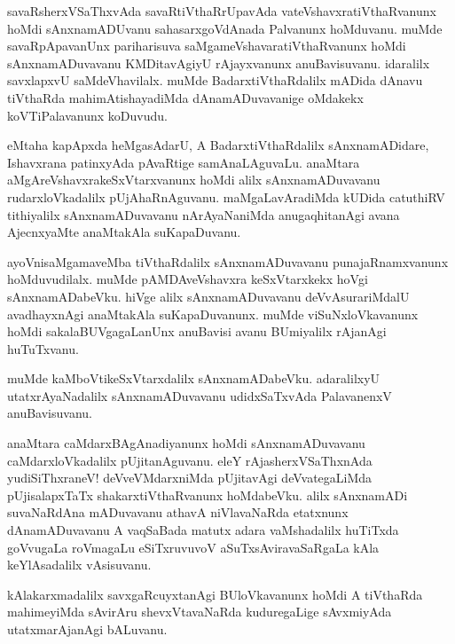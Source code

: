 \documentclass{article}
\begin{document}
\begin{mn}
savaRsherxVSaThxvAda savaRtiVthaRrUpavAda vateVshavxratiVthaRvanunx hoMdi sAnxnamADUvanu 
sahasarxgoVdAnada Palvanunx  hoMduvanu. muMde savaRpApavanUnx pariharisuva 
saMgameVshavaratiVthaRvanunx hoMdi sAnxnamADuvavanu KMDitavAgiyU rAjayxvanunx anuBavisuvanu. 
idaralilx savxlapxvU saMdeVhavilalx. muMde BadarxtiVthaRdalilx mADida dAnavu tiVthaRda 
mahimAtishayadiMda dAnamADuvavanige oMdakekx koVTiPalavanunx koDuvudu.
\end{mn}

\begin{mn}
eMtaha kapApxda heMgasAdarU, A BadarxtiVthaRdalilx sAnxnamADidare, Ishavxrana patinxyAda pAvaRtige 
samAnaLAguvaLu. anaMtara aMgAreVshavxrakeSxVtarxvanunx hoMdi alilx sAnxnamADuvavanu 
rudarxloVkadalilx pUjAhaRnAguvanu. maMgaLavAradiMda kUDida  catuthiRV tithiyalilx sAnxnamADuvavanu
nArAyaNaniMda anugaqhitanAgi avana AjecnxyaMte anaMtakAla suKapaDuvanu.
\end{mn}

\begin{mn}
ayoVnisaMgamaveMba tiVthaRdalilx sAnxnamADuvavanu punajaRnamxvanunx hoMduvudilalx. muMde 
pAMDAveVshavxra keSxVtarxkekx hoVgi sAnxnamADabeVku. hiVge alilx sAnxnamADuvavanu 
deVvAsurariMdalU avadhayxnAgi anaMtakAla suKapaDuvanunx. muMde viSuNxloVkavanunx hoMdi 
sakalaBUVgagaLanUnx anuBavisi avanu BUmiyalilx rAjanAgi huTuTxvanu.
\end{mn}

\begin{mn}
muMde kaMboVtikeSxVtarxdalilx sAnxnamADabeVku. adaralilxyU utatxrAyaNadalilx sAnxnamADuvavanu 
udidxSaTxvAda PalavanenxV anuBavisuvanu.
\end{mn}

\begin{mn}
anaMtara caMdarxBAgAnadiyanunx hoMdi sAnxnamADuvavanu caMdarxloVkadalilx pUjitanAguvanu. eleY 
rAjasherxVSaThxnAda yudiSiThxraneV! deVveVMdarxniMda pUjitavAgi deVvategaLiMda pUjisalapxTaTx 
shakarxtiVthaRvanunx hoMdabeVku. alilx sAnxnamADi suvaNaRdAna mADuvavanu athavA niVlavaNaRda 
etatxnunx dAnamADuvavanu A vaqSaBada matutx adara vaMshadalilx  huTiTxda goVvugaLa roVmagaLu
eSiTxruvuvoV aSuTxsAviravaSaRgaLa kAla keYlAsadalilx vAsisuvanu.

\end{mn}

\begin{mn}
kAlakarxmadalilx savxgaRcuyxtanAgi BUloVkavanunx hoMdi A tiVthaRda mahimeyiMda sAvirAru 
shevxVtavaNaRda kuduregaLige sAvxmiyAda utatxmarAjanAgi bALuvanu.
\end{mn}
\end{document}
